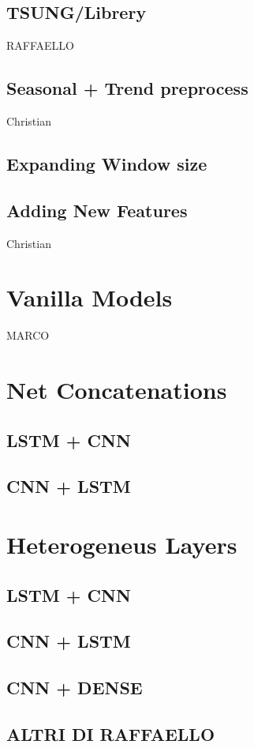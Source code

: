\documentclass[11pt]{article}
\begin{document}
\subsection{TSUNG/Librery}
 RAFFAELLO
\subsection{Seasonal + Trend preprocess}
Christian
\subsection{Expanding Window size}
\subsection{Adding New Features}
Christian
\section{Vanilla Models}
MARCO
\section{Net Concatenations}
\subsection{LSTM + CNN}
\subsection{CNN + LSTM}

\section{Heterogeneus Layers}
\subsection{LSTM + CNN}
\subsection{CNN + LSTM}

\subsection{CNN + DENSE}
\subsection{ALTRI DI RAFFAELLO}
\end{document}
